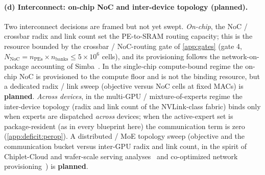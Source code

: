 \paragraph{(d) Interconnect: on-chip NoC and inter-device topology (planned).}
Two interconnect decisions are framed but not yet swept.
\emph{On-chip}, the NoC / crossbar radix and link count set the PE-to-SRAM
routing capacity; this is the resource bounded by the crossbar / NoC-routing
gate of \cref{app:gates} (gate 4, $N_{\mathrm{NoC}}=n_{\mathrm{PEs}}\times
n_{\mathrm{banks}}\le5\times10^{6}$ cells), and its provisioning follows the
network-on-package accounting of Simba~\citep{shao2019simba}. In the single-chip
compute-bound regime the on-chip NoC is provisioned to the compute floor and is
not the binding resource, but a dedicated radix / link sweep (objective
versus NoC cells at fixed MACs) is
\textcolor{orange!85!black}{\textbf{planned}}.
\emph{Across devices}, in the multi-GPU / mixture-of-experts regime the
inter-device topology (radix and link count of the NVLink-class fabric) binds
only when experts are dispatched \emph{across} devices; when the active-expert
set is package-resident (as in every blueprint here) the communication term is
zero (\cref{app:deficit:perop}). A distributed / MoE topology sweep (objective
and the communication bucket versus inter-GPU radix and link count, in the
spirit of Chiplet-Cloud and wafer-scale serving
analyses~\citep{peng2024chipletcloudbuildingai,zhu2024theseusexploringefficientwaferscale}
and co-optimized network provisioning~\citep{rashidi2023unico}) is
\textcolor{orange!85!black}{\textbf{planned}}.

